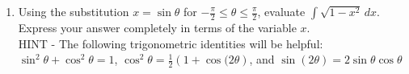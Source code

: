 \documentclass[12pt]{article}
\newif\ifans
\begin{document}
\begin{enumerate}
\item Using the substitution $x=\sin{\theta}$ for $-\frac{\pi}{2} \leq \theta \leq \frac{\pi}{2}$, evaluate $\int{\sqrt{1-x^2}} \,dx$.  Express your answer completely in terms of the variable $x$.\\

HINT - The following trigonometric identities will be helpful:
$\sin^2{\theta}+\cos^2{\theta}=1$, $\cos^{2}{\theta}=\frac{1}{2}(1+\cos{(2\theta})$, and $\sin{(2\theta)}=2\sin{\theta}\cos{\theta}$\\

\ifans{\fbox{$\frac{1}{2}x\sqrt{1-x^2}+\frac{1}{2}\sin^{-1}{x}+C$}} \fi

\end{enumerate}
\end{document}
